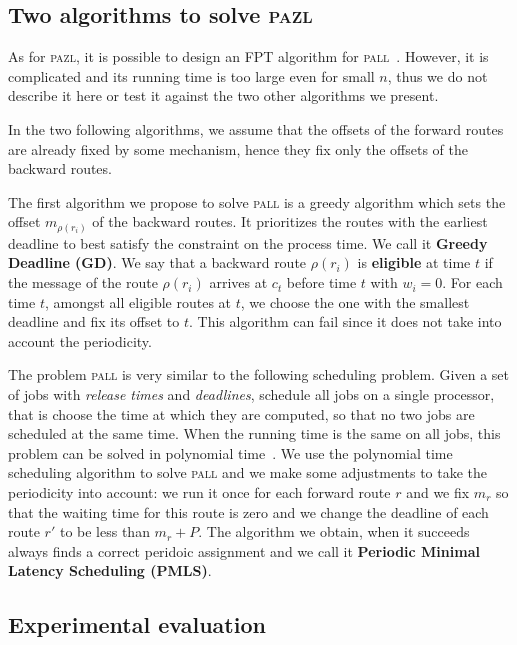 \documentclass[10pt, conference, letterpaper]{IEEEtran}
\newcommand\pazl{\textsc{pazl}\xspace}
\newcommand\pall{\textsc{pall}\xspace}
\begin{document}
  \subsection{Two algorithms to solve \pazl}
  
  As for \pazl, it is possible to design an FPT algorithm for \pall~\cite{versionlongue}. 
  However, it is complicated and its running time is too large even for small $n$,
  thus we do not describe it here or test it against the two other algorithms we present.
  
  In the two following algorithms, we assume that the offsets of the forward routes are already fixed by some mechanism, hence they fix only the offsets of the backward routes. 
    
    The first algorithm we propose to solve \pall is a greedy algorithm which sets the offset $m_{\rho(r_i)}$ of the 
    backward routes. It prioritizes the routes with the earliest deadline to best satisfy the
    constraint on the process time. We call it \textbf{Greedy Deadline (GD)}. We say that a backward route $\rho(r_i)$ is {\bf eligible} at time $t$ if the message of the route $\rho(r_i)$ arrives at $c_t$ before time $t$ with $w_i = 0$. For each time $t$, amongst all eligible routes at $t$, we choose the one with the smallest deadline and fix its offset to $t$.
    This algorithm can fail since it does not take into account the periodicity.
    
     The problem \pall is very similar to the following scheduling problem. Given a set of jobs with \emph{release times} and  \emph{deadlines}, schedule all jobs on a single processor, that is choose the time at which they are computed, so that no two jobs are scheduled at the same time. When the running time is the same on all jobs, this problem can be solved in polynomial time~\cite{simons1978fast}. We use the polynomial time scheduling algorithm to solve \pall and we make some adjustments to take the periodicity into account: we run it once for each forward route $r$ and we fix $m_r$ so that the waiting time for this route is zero and we change the deadline of each route $r'$ to be less than $m_{r} + P$. The algorithm we obtain, when it succeeds always finds a correct peridoic assignment and we call it {\bf Periodic Minimal Latency Scheduling (PMLS)}.

     
    \subsection{Experimental evaluation}
    \label{sec:resultsPALL}
    
\end{document}
